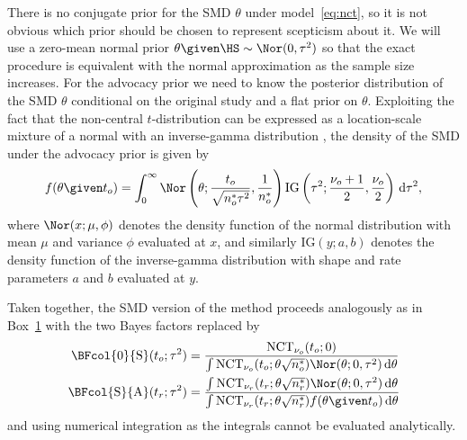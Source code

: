 There is no conjugate prior for the SMD $\theta$ under model~\eqref{eq:nct}, so
it is not obvious which prior should be chosen to represent scepticism about it.
We will use a zero-mean normal prior $\theta \given \HS \sim \Nor(0, \tau^{2})$
so that the exact procedure is equivalent with the normal approximation as the
sample size increases. For the advocacy prior we need to know the posterior
distribution of the SMD $\theta$ conditional on the original study and a flat
prior on $\theta$. Exploiting the fact that the non-central $t$-distribution can
be expressed as a location-scale mixture of a normal with an inverse-gamma
distribution
\citep[Chapter 31]{Johnson1995}, the density of the SMD under the advocacy prior
is given by
\begin{align*}
  f(\theta \given t_o)
  = \int_0^\infty \Nor\left(\theta; \frac{t_o}{\sqrt{n_o^* \tau^2}},
  \frac{1}{n_o^*}\right)  \text{IG}\left(\tau^2; \frac{\nu_o + 1}{2},
  \frac{\nu_o}{2}\right) \, \text{d}\tau^2,
\end{align*}
where $\Nor(x; \mu, \phi)$ denotes the density function of the normal
distribution with mean $\mu$ and variance $\phi$ evaluated at $x$, and similarly
$\text{IG}(y; a, b)$ denotes the density function of the inverse-gamma
distribution with shape and rate parameters $a$ and $b$ evaluated at $y$.

Taken together, the SMD version of the method proceeds analogously as in
Box~\hyperref[box:nutshell]{1} with the two Bayes factors replaced by
\begin{align*}
  \BFcol{0}{\mathrm{S}}(t_{o};\tau^{2})
  &= \frac{\text{NCT}_{\nu_{o}}(t_{o}; 0)}{\int
  \text{NCT}_{\nu_{o}}(t_{o}; \theta \sqrt{n_{o}^{*}})
  \Nor(\theta; 0, \tau^{2}) \, \text{d}\theta} \\
  \BFcol{\text{S}}{\text{A}}(t_{r};\tau^{2})
  &= \frac{\int\text{NCT}_{\nu_{r}}(t_{r};\theta
  \sqrt{n_{r}^{*}})\Nor(\theta; 0, \tau^{2}) \, \text{d}\theta}{
  \int\text{NCT}_{\nu_{r}}(t_{r};\theta
  \sqrt{n_{r}^{*}}) f(\theta \given t_{o}) \, \text{d} \theta}
\end{align*}
and using numerical integration as the integrals cannot be evaluated
analytically.



